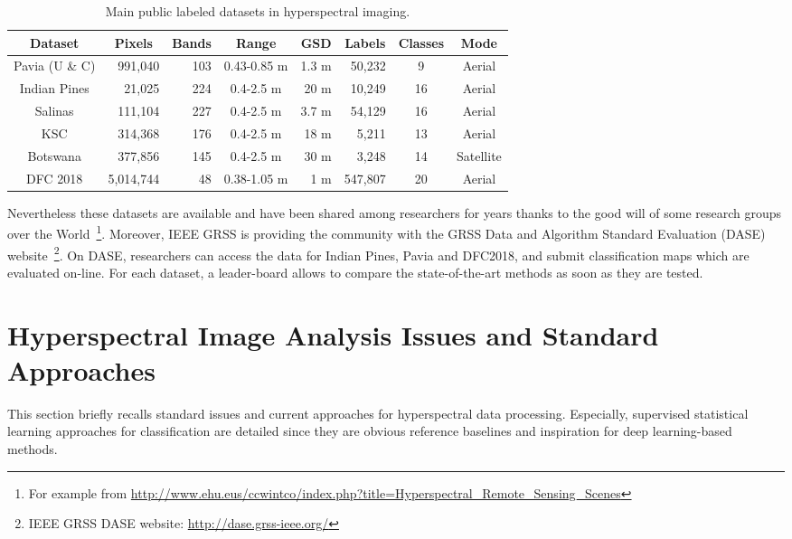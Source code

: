 \documentclass[journal]{IEEEtran}
\begin{document}
\begin{table}[bht]
\caption{Main public labeled datasets in hyperspectral imaging.}\label{tab:hyperx_datasets}\setlength{\tabcolsep}{1pt}
\begin{tabularx}{0.5\textwidth}{ c r r c r r c c }
\toprule
Dataset & \multicolumn{1}{c}{Pixels} & Bands & Range & \multicolumn{1}{c}{GSD} & \multicolumn{1}{c}{Labels} & Classes & Mode\\
\midrule
Pavia (U \& C) & 991,040 & 103 & 0.43-0.85 m & 1.3 m & 50,232 & 9 & Aerial\\
Indian Pines & 21,025 & 224 & 0.4-2.5 m & 20 m & 10,249 & 16 & Aerial\\
Salinas & 111,104 & 227 & 0.4-2.5 m & 3.7 m & 54,129 & 16 & Aerial\\
KSC & 314,368 & 176 & 0.4-2.5 m & 18 m & 5,211 & 13 & Aerial\\
Botswana & 377,856 & 145 & 0.4-2.5 m & 30 m & 3,248 & 14 & Satellite\\
DFC 2018 & 5,014,744 & 48 & 0.38-1.05 m & 1 m & 547,807 & 20 & Aerial\\
\bottomrule
\end{tabularx}
\end{table}

Nevertheless these datasets are available and have been shared among researchers for years thanks to the good will of some research groups over the World~\footnote{For example from \url{http://www.ehu.eus/ccwintco/index.php?title=Hyperspectral_Remote_Sensing_Scenes}}. Moreover, {IEEE GRSS} is providing the community with the GRSS Data and Algorithm Standard Evaluation (DASE) website~\footnote{IEEE GRSS DASE website: \url{http://dase.grss-ieee.org/}}. On DASE, researchers can access the data for Indian Pines, Pavia and DFC2018, and submit classification maps which are evaluated on-line. For each dataset, a leader-board allows to compare the state-of-the-art methods as soon as they are tested.

\section{Hyperspectral Image Analysis Issues and Standard Approaches}





This section briefly recalls standard issues and current approaches for hyperspectral data processing. Especially, supervised statistical learning approaches for classification are  detailed since they are obvious reference baselines and inspiration for deep learning-based methods.
\end{document}
